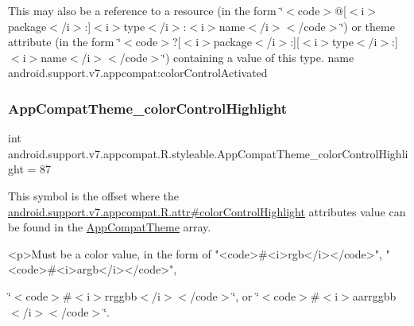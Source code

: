 This may also be a reference to a resource (in the form \char`\"{}$<$code$>$@\mbox{[}$<$i$>$package$<$/i$>$\+:\mbox{]}$<$i$>$type$<$/i$>$\+:$<$i$>$name$<$/i$>$$<$/code$>$\char`\"{}) or theme attribute (in the form \char`\"{}$<$code$>$?\mbox{[}$<$i$>$package$<$/i$>$\+:\mbox{]}\mbox{[}$<$i$>$type$<$/i$>$\+:\mbox{]}$<$i$>$name$<$/i$>$$<$/code$>$\char`\"{}) containing a value of this type.  name android.\+support.\+v7.\+appcompat\+:color\+Control\+Activated \mbox{\label{classandroid_1_1support_1_1v7_1_1appcompat_1_1R_1_1styleable_a504c897bce159e8458dad5fa7717be03}} 
\subsubsection{\texorpdfstring{App\+Compat\+Theme\+\_\+color\+Control\+Highlight}{AppCompatTheme\_colorControlHighlight}}
{\footnotesize\ttfamily int android.\+support.\+v7.\+appcompat.\+R.\+styleable.\+App\+Compat\+Theme\+\_\+color\+Control\+Highlight = 87\hspace{0.3cm}{\ttfamily [static]}}

This symbol is the offset where the \hyperlink{classandroid_1_1support_1_1v7_1_1appcompat_1_1R_1_1attr_a81fd6db47694d2d9f1c8ce4109695892}{android.\+support.\+v7.\+appcompat.\+R.\+attr\#color\+Control\+Highlight} attribute\textquotesingle{}s value can be found in the \hyperlink{classandroid_1_1support_1_1v7_1_1appcompat_1_1R_1_1styleable_a5c42f89e8a410c323be34208d75c430b}{App\+Compat\+Theme} array.

\begin{DoxyVerb}      <p>Must be a color value, in the form of "<code>#<i>rgb</i></code>", "<code>#<i>argb</i></code>",
\end{DoxyVerb}
 \char`\"{}$<$code$>$\#$<$i$>$rrggbb$<$/i$>$$<$/code$>$\char`\"{}, or \char`\"{}$<$code$>$\#$<$i$>$aarrggbb$<$/i$>$$<$/code$>$\char`\"{}. 

